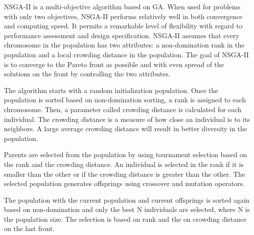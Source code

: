 \documentclass{llncs}
\begin{document}
NSGA-II is a multi-objective algorithm based on GA. When used for problems with only two objectives, NSGA-II performs 
relatively well in both convergence and  computing speed. It permits a remarkable level of flexibility with regard to 
performance assessment and design specification. NSGA-II assumes that every chromosome in the population has two 
attributes: a non-domination rank in the population and a local crowding distance in the population. The goal of 
NSGA-II is to converge to the Pareto front as possible and with even spread of the solutions on the front by 
controlling the two attributes. 

The algorithm starts with a random initialization population. Once the population is sorted based on non-domination sorting, a rank is assigned to each chromosome.
Then, a parameter called crowding distance is calculated for each individual. The crowding distance is a measure of how close an individual is to its neighbors. A large 
average crowding distance will result in better diversity in the population. 

Parents are selected from the population by using tournament selection based on the rank and the crowding distance. An individual is selected in the rank if it is smaller than the other or 
if the crowding distance is greater than the other. The selected population generates offsprings using crossover and mutation operators. 

The population with the current population and current offsprings is sorted again based on non-domination and only the best N individuals are selected, where N is the population size.
The selection is based on rank and the on crowding distance on the last front.
\end{document}
